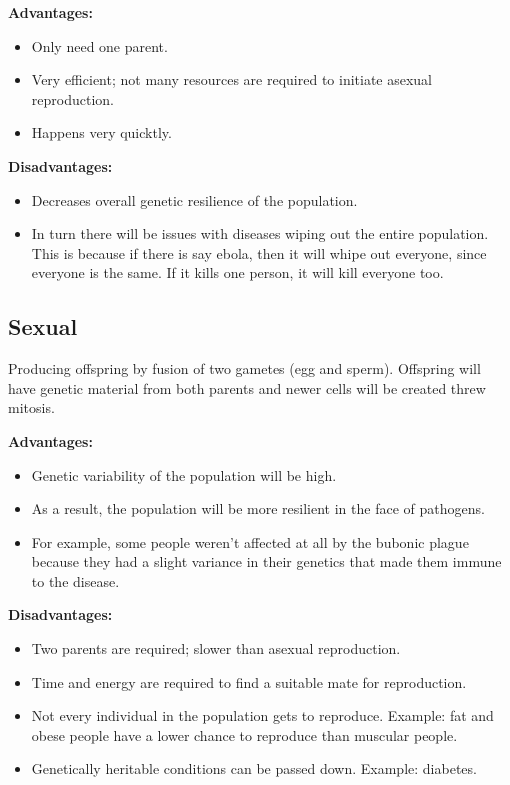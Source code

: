 \documentclass[12pt]{report}
\begin{document}
\textbf{Advantages:}
\begin{itemize}
    \item{Only need one parent.}
    \item{Very efficient; not many resources are required to initiate asexual reproduction.}
    \item{Happens very quicktly.}
\end{itemize}

\textbf{Disadvantages:}
\begin{itemize}
    \item{Decreases overall genetic resilience of the population.}
    \item{In turn there will be issues with diseases wiping out the entire population. This is because if there is say ebola, then it will whipe out everyone, since everyone is the same. If it kills one person, it will kill everyone too.}
\end{itemize}

\subsection{Sexual}
\begin{definition}[Sexual]
    Producing offspring by fusion of two gametes (egg and sperm). Offspring will have genetic material from both parents and newer cells will be created threw mitosis.
\end{definition}

\textbf{Advantages:}
\begin{itemize}
    \item{Genetic variability of the population will be high.}
    \item{As a result, the population will be more resilient in the face of pathogens.}
    \item{For example, some people weren't affected at all by the bubonic plague because they had a slight variance in their genetics that made them immune to the disease.}
\end{itemize}

\textbf{Disadvantages:}
\begin{itemize}
    \item{Two parents are required; slower than asexual reproduction.}
    \item{Time and energy are required to find a suitable mate for reproduction.}
    \item{Not every individual in the population gets to reproduce. Example: fat and obese people have a lower chance to reproduce than muscular people.}
    \item{Genetically heritable conditions can be passed down. Example: diabetes.}
\end{itemize}
\end{document}
